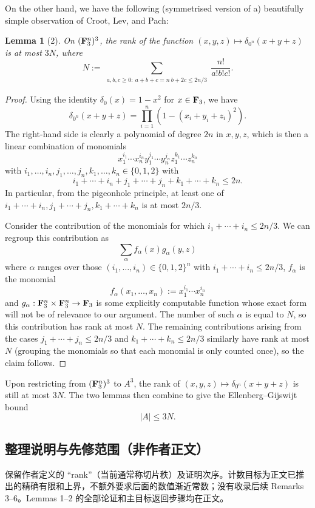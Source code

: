 \documentclass[UTF8,11pt]{ctexart}
\newtheorem*{lemma}{Lemma}
\theoremstyle{definition}
\begin{document}
On the other hand, we have the following (symmetrised version of a) beautifully simple observation of Croot, Lev, and Pach:
\begin{lemma}[2]
On $({\bf F}_3^n)^3$, the rank of the function $(x,y,z)\mapsto\delta_{0^n}(x+y+z)$ is at most $3N$, where
\[
N:=\sum_{\substack{a,b,c\ge0:\ a+b+c=n\ b+2c\le2n/3}}\frac{n!}{a!b!c!}.
\]
\end{lemma}
\begin{proof}
Using the identity $\delta_0(x)=1-x^2$ for $x\in{\bf F}_3$, we have
\[
\delta_{0^n}(x+y+z)=\prod_{i=1}^n(1-(x_i+y_i+z_i)^2).
\]
The right-hand side is clearly a polynomial of degree $2n$ in $x,y,z$, which is then a linear combination of monomials
\[
x_1^{i_1}\cdots x_n^{i_n}y_1^{j_1}\cdots y_n^{j_n}z_1^{k_1}\cdots z_n^{k_n}
\]
with $i_1,\ldots,i_n,j_1,\ldots,j_n,k_1,\ldots,k_n\in\{0,1,2\}$ with
\[
i_1+\cdots+i_n+j_1+\cdots+j_n+k_1+\cdots+k_n\le2n.
\]
In particular, from the pigeonhole principle, at least one of $i_1+\cdots+i_n,j_1+\cdots+j_n,k_1+\cdots+k_n$ is at most $2n/3$.

Consider the contribution of the monomials for which $i_1+\cdots+i_n\le2n/3$. We can regroup this contribution as
\[
\sum_\alpha f_\alpha(x)g_\alpha(y,z)
\]
where $\alpha$ ranges over those $(i_1,\ldots,i_n)\in\{0,1,2\}^n$ with $i_1+\cdots+i_n\le2n/3$, $f_\alpha$ is the monomial
\[
f_\alpha(x_1,\ldots,x_n):=x_1^{i_1}\cdots x_n^{i_n}
\]
and $g_\alpha:{\bf F}_3^n\times{\bf F}_3^n\to{\bf F}_3$ is some explicitly computable function whose exact form will not be of relevance to our argument. The number of such $\alpha$ is equal to $N$, so this contribution has rank at most $N$. The remaining contributions arising from the cases $j_1+\cdots+j_n\le2n/3$ and $k_1+\cdots+k_n\le2n/3$ similarly have rank at most $N$ (grouping the monomials so that each monomial is only counted once), so the claim follows.
\end{proof}

Upon restricting from $({\bf F}_3^n)^3$ to $A^3$, the rank of $(x,y,z)\mapsto\delta_{0^n}(x+y+z)$ is still at most $3N$. The two lemmas then combine to give the Ellenberg--Gijswijt bound
\[
|A|\le3N.
\]

\subsection*{整理说明与先修范围（非作者正文）}
保留作者定义的 ``rank''（当前通常称切片秩）及证明次序。计数目标为正文已推出的精确有限和上界，不额外要求后面的数值渐近常数；没有收录后续 Remarks 3--6。Lemmas 1--2 的全部论证和主目标返回步骤均在正文。
\end{document}
